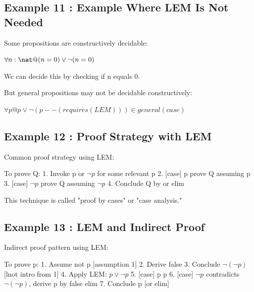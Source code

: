 \documentclass[a4paper,10pt,fleqn]{article}
\begin{document}
\subsection*{Example 11 : Example Where LEM Is Not Needed}

\noindent Some propositions are constructively decidable:

\bigskip

\noindent
$\forall n : \nat @ (n = 0) \lor \lnot (n = 0)$


\noindent We can decide this by checking if n equals 0.

\bigskip

\noindent But general propositions may not be decidable constructively:

\bigskip

\noindent
$\forall p @ p \lor \lnot (p - -(requires(LEM))) \in general(case)$


\subsection*{Example 12 : Proof Strategy with LEM}

\noindent Common proof strategy using LEM:

\bigskip

\noindent To prove Q: 1. Invoke p or $\lnot p$ for some relevant p 2. [case] p prove Q assuming p 3. [case] $\lnot p$ prove Q assuming $\lnot p$ 4. Conclude Q by or elim

\bigskip

\noindent This technique is called "proof by cases" or "case analysis."

\bigskip

\subsection*{Example 13 : LEM and Indirect Proof}

\noindent Indirect proof pattern using LEM:

\bigskip

\noindent To prove p: 1. Assume not p [assumption 1] 2. Derive false 3. Conclude $\lnot (\lnot p)$ [lnot intro from 1] 4. Apply LEM: $p \lor \lnot p$ 5. [case] p p 6. [case] $\lnot p$ contradicts $\lnot (\lnot p)$, derive p by false elim 7. Conclude p [or elim]
\end{document}
